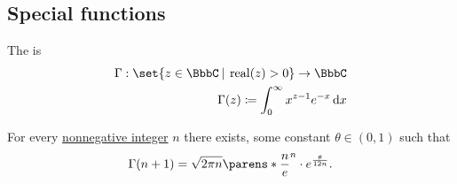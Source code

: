 \subsection{Special functions}\label{subsec:special_functions}

\begin{definition}\label{def:gamma_function}
  The  is
  \begin{equation*}
    \begin{aligned}
      \Gamma: \set{ z \in \BbbC \given \real(z) > 0 } \to \BbbC \\
      \Gamma(z) \coloneqq \int_0^\infty x^{z-1} e^{-x} \dl x
    \end{aligned}
  \end{equation*}
\end{definition}

\begin{theorem}\label{thm:stirlings_gamma_approximation}
  For every \hyperref[rem:peano_arithmetic_zero/nonnegative]{nonnegative integer} \( n \) there exists, some constant \( \theta \in (0, 1) \) such that
  \begin{equation*}
    \Gamma(n + 1) = \sqrt{2 \pi n} \parens*{ \frac n e }^n \cdot e^{\frac \theta {12n}}.
  \end{equation*}
\end{theorem}
